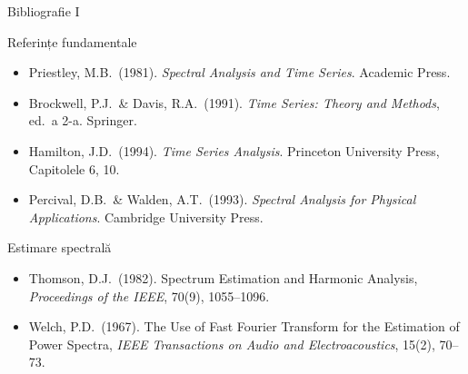 \documentclass[9pt, aspectratio=169, t]{beamer}
\begin{document}
\begin{frame}{Bibliografie I}
    \begin{block}{Referințe fundamentale}
        {\footnotesize
        \begin{itemize}\setlength{\itemsep}{0pt}
            \item Priestley, M.B.\ (1981). \textit{Spectral Analysis and Time Series}. Academic Press.
            \item Brockwell, P.J.\ \& Davis, R.A.\ (1991). \textit{Time Series: Theory and Methods}, ed.\ a 2-a. Springer.
            \item Hamilton, J.D.\ (1994). \textit{Time Series Analysis}. Princeton University Press, Capitolele 6, 10.
            \item Percival, D.B.\ \& Walden, A.T.\ (1993). \textit{Spectral Analysis for Physical Applications}. Cambridge University Press.
        \end{itemize}
        }
    \end{block}

    \begin{exampleblock}{Estimare spectrală}
        {\footnotesize
        \begin{itemize}\setlength{\itemsep}{0pt}
            \item Thomson, D.J.\ (1982). Spectrum Estimation and Harmonic Analysis, \textit{Proceedings of the IEEE}, 70(9), 1055--1096.
            \item Welch, P.D.\ (1967). The Use of Fast Fourier Transform for the Estimation of Power Spectra, \textit{IEEE Transactions on Audio and Electroacoustics}, 15(2), 70--73.
        \end{itemize}
        }
    \end{exampleblock}
\end{frame}
\end{document}
